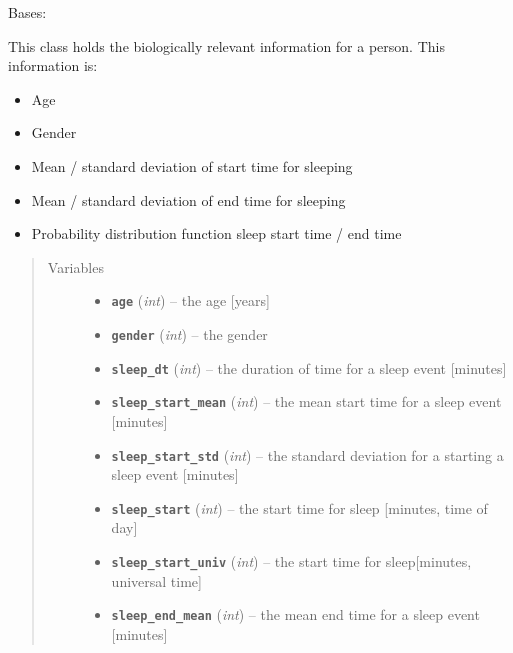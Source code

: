 \documentclass[letterpaper,10pt,english]{sphinxmanual}
\begin{document}
\begin{fulllineitems}
\label{bio:bio.Bio}
Bases: 

This class holds the biologically relevant information for a person. This information is:
\begin{itemize}
\item {} 
Age

\item {} 
Gender

\item {} 
Mean / standard deviation of start time for sleeping

\item {} 
Mean / standard deviation of end time for sleeping

\item {} 
Probability distribution function sleep start time / end time

\end{itemize}
\begin{quote}\begin{description}
\item[{Variables}] \leavevmode\begin{itemize}
\item {} 
\textbf{\texttt{age}} (\emph{int}) -- the age {[}years{]}

\item {} 
\textbf{\texttt{gender}} (\emph{int}) -- the gender

\item {} 
\textbf{\texttt{sleep\_dt}} (\emph{int}) -- the duration of time for a sleep event {[}minutes{]}

\item {} 
\textbf{\texttt{sleep\_start\_mean}} (\emph{int}) -- the mean start time for a sleep event {[}minutes{]}

\item {} 
\textbf{\texttt{sleep\_start\_std}} (\emph{int}) -- the standard deviation for a starting a sleep event {[}minutes{]}

\item {} 
\textbf{\texttt{sleep\_start}} (\emph{int}) -- the start time for sleep {[}minutes, time of day{]}

\item {} 
\textbf{\texttt{sleep\_start\_univ}} (\emph{int}) -- the start time for sleep{[}minutes, universal time{]}

\item {} 
\textbf{\texttt{sleep\_end\_mean}} (\emph{int}) -- the mean end time for a sleep event {[}minutes{]}


\end{itemize}
\end{description}
\end{quote}
\end{fulllineitems}
\end{document}
